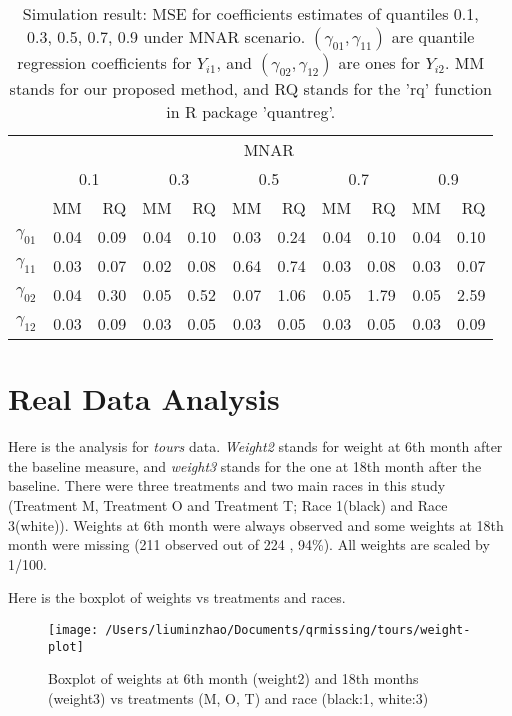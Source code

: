 \documentclass[12pt]{article}
\begin{document}
\begin{table}[h]
  \renewcommand{\arraystretch}{1.3}
  \centering
  \caption{Simulation result: MSE for coefficients estimates of quantiles
    0.1, 0.3, 0.5, 0.7, 0.9 under MNAR scenario. $(\gamma_{01}, \gamma_{11})$ 
    are quantile regression coefficients for $Y_{i1}$, and $(\gamma_{02}, \gamma_{12})$ 
    are ones for $Y_{i2}$. MM stands for our proposed method, and RQ stands for the 'rq' 
    function in R package 'quantreg'.}
  \vspace{10pt}
  \begin{tabular}{rrrrrrrrrrr}
    \toprule
    & \multicolumn{ 10}{c}{MNAR} \\
    \cline{2-11}
    &  \multicolumn{2}{c}{0.1} &  \multicolumn{2}{c}{0.3} &  \multicolumn{2}{c}{0.5} 
&  \multicolumn{2}{c}{0.7} &  \multicolumn{2}{c}{0.9} \\
    \cline{2-11}
    & MM & RQ    & MM & RQ    & MM & RQ    & MM & RQ    & MM & RQ \\
    \hline
    $\gamma_{01}$ & 0.04 &0.09&0.04 &0.10 &0.03 &0.24 &0.04 &0.10 &0.04 &0.10 \\
    $\gamma_{11}$ & 0.03 &0.07&0.02 &0.08 &0.64 &0.74 &0.03 &0.08 &0.03 &0.07 \\ 
    $\gamma_{02}$ & 0.04 &0.30&0.05 &0.52 &0.07 &1.06 &0.05 &1.79 &0.05 &2.59 \\ 
    $\gamma_{12}$ & 0.03 &0.09&0.03 &0.05 &0.03 &0.05 &0.03 &0.05 &0.03 &0.09 \\ 
    \bottomrule
  \end{tabular}  \label{tab:sim2}
\end{table}


\section{Real Data Analysis}
\label{sec:real}
Here is the analysis for \textit{tours} data. \textit{Weight2} stands
for weight at 6th month after the baseline measure, and
\textit{weight3} stands for the one at 18th month after the
baseline. There were three treatments and two main races in this study
(Treatment M, Treatment O and Treatment T; Race 1(black) and Race
3(white)). Weights at 6th month were always observed and some weights
at 18th month were missing (211 observed out of 224 , 94\%). All
weights are scaled by 1/100.

Here is the boxplot of weights vs treatments and races.

\begin{figure}[htb]
  \centerline{\texttt{[image: /Users/liuminzhao/Documents/qrmissing/tours/weight-plot]}}
  \caption[]{\label{fig:tours} Boxplot of weights at 6th month
    (weight2) and 18th months (weight3) vs treatments (M, O, T) and
    race (black:1, white:3)}
\end{figure}
\end{document}
